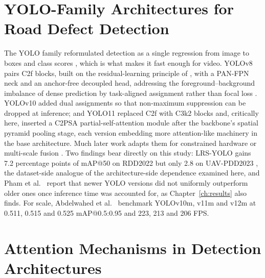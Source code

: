 \documentclass[MScCS]{uccthesis}
\begin{document}
\section{YOLO-Family Architectures for Road Defect Detection}
\label{sec:yolo_family}

The YOLO family reformulated detection as a single regression from image to
boxes and class scores \parencite{redmon2016yolo}, which is what makes it fast
enough for video. YOLOv8 \parencite{ultralytics2023yolov8} pairs C2f blocks,
built on the residual-learning principle of \textcite{he2016resnet}, with a
PAN-FPN neck and an anchor-free decoupled head, addressing the
foreground--background imbalance of dense prediction by task-aligned assignment
rather than focal loss \parencite{lin2017focal}. YOLOv10
\parencite{wang2024yolov10} added dual assignments so that non-maximum
suppression can be dropped at inference; and YOLO11
\parencite{ultralytics2024yolov11} replaced C2f with C3k2 blocks and, critically
here, inserted a C2PSA partial-self-attention module after the backbone's
spatial pyramid pooling stage, each version embedding more attention-like
machinery in the base architecture. Much later work adapts them for
constrained hardware or multi-scale fusion
\parencite{li2024bseyolo,he2024lmferdd,pei2024yolordd}. Two findings bear
directly on this study: LRS-YOLO gains 7.2 percentage points of mAP@50 on
RDD2022 but only 2.8 on UAV-PDD2023 \parencite{chen2024lrsyolo}, the
dataset-side analogue of the architecture-side dependence examined here, and
Pham et al.~\parencite{pham2024optimizing} report that newer YOLO versions did
not uniformly outperform older ones once inference time was accounted for, as
Chapter~\ref{ch:results} also finds. For scale, Abdelwahed et
al.~\parencite{abdelwahed2025advancements} benchmark YOLOv10m, v11m and v12m at
0.511, 0.515 and 0.525 mAP@0.5:0.95 and 223, 213 and 206 FPS.


\section{Attention Mechanisms in Detection Architectures}
\label{sec:attention_related}
\end{document}
